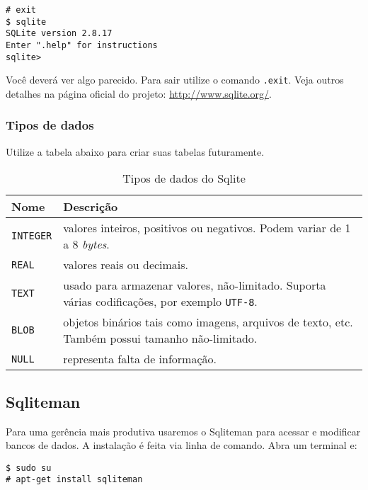 \begin{flushleft}
\texttt{\# exit \\
\$ sqlite \\
SQLite version 2.8.17\\
Enter ".help" for instructions\\
sqlite>\\}
\end{flushleft}

Você deverá ver algo parecido. Para sair utilize o comando \texttt{.exit}. Veja outros detalhes na página
oficial do projeto: \url{http://www.sqlite.org/}.

\subsubsection{Tipos de dados}

Utilize a tabela abaixo para criar suas tabelas futuramente.

\begin{table}[H]
\begin{tabularx}{400pt}{lX}
\hline
\textbf{Nome} & \textbf{Descrição} \\
\hline
\texttt{INTEGER} & valores inteiros, positivos ou negativos. Podem variar de 1 a 8 \textit{bytes}.\\
\texttt{REAL} & valores reais ou decimais.\\
\texttt{TEXT} & usado para armazenar valores, não-limitado. Suporta várias codificações, por exemplo \texttt{UTF-8}.\\
\texttt{BLOB} & objetos binários tais como imagens, arquivos de texto, etc. Também possui tamanho não-limitado.\\
\texttt{NULL} & representa falta de informação.\\
\hline
\end{tabularx}
\caption{Tipos de dados do Sqlite}
\end{table}

\subsection{Sqliteman}

Para uma gerência mais produtiva usaremos o Sqliteman para acessar e modificar bancos de dados. A instalação
é feita via linha de comando. Abra um terminal e:

\begin{flushleft}
\texttt{\$ sudo su\\
\# apt-get install sqliteman\\}
\end{flushleft}

